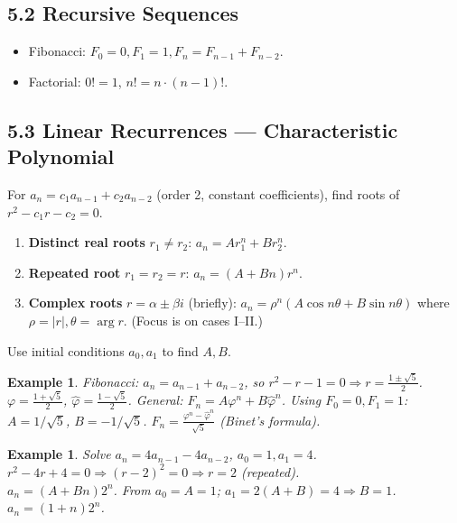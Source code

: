 \documentclass[11pt]{article}
\newtheorem{example}[definition]{Example}
\begin{document}
\subsection*{5.2 Recursive Sequences}

\begin{itemize}[nosep]
  \item Fibonacci: $F_0=0,F_1=1,F_n=F_{n-1}+F_{n-2}$.
  \item Factorial: $0!=1$, $n!=n\cdot(n-1)!$.
\end{itemize}

\subsection*{5.3 Linear Recurrences — Characteristic Polynomial}

For $a_n = c_1 a_{n-1}+c_2 a_{n-2}$ (order 2, constant coefficients), find roots of $r^2-c_1 r-c_2=0$.

\begin{tcolorbox}[keybox={Three cases}]
\begin{enumerate}[nosep,label=\Roman*.]
  \item \textbf{Distinct real roots} $r_1\ne r_2$: $a_n=A r_1^n+B r_2^n$.
  \item \textbf{Repeated root} $r_1=r_2=r$: $a_n=(A+Bn)r^n$.
  \item \textbf{Complex roots} $r=\alpha\pm\beta i$ (briefly): $a_n=\rho^n(A\cos n\theta+B\sin n\theta)$ where $\rho=|r|,\theta=\arg r$. (Focus is on cases I–II.)
\end{enumerate}
Use initial conditions $a_0,a_1$ to find $A,B$.
\end{tcolorbox}

\begin{example}
Fibonacci: $a_n=a_{n-1}+a_{n-2}$, so $r^2-r-1=0\Rightarrow r=\frac{1\pm\sqrt5}{2}$.\\
$\varphi=\frac{1+\sqrt5}{2}$, $\hat\varphi=\frac{1-\sqrt5}{2}$.
General: $F_n=A\varphi^n+B\hat\varphi^n$. Using $F_0=0,F_1=1$:
$A=1/\sqrt5$, $B=-1/\sqrt5$.
$\boxed{F_n=\frac{\varphi^n-\hat\varphi^n}{\sqrt5}}$ (Binet's formula).
\end{example}

\begin{example}
Solve $a_n=4a_{n-1}-4a_{n-2}$, $a_0=1,a_1=4$.\\
$r^2-4r+4=0\Rightarrow (r-2)^2=0\Rightarrow r=2$ (repeated).\\
$a_n=(A+Bn)2^n$. From $a_0=A=1$; $a_1=2(A+B)=4\Rightarrow B=1$.\\
$a_n=(1+n)2^n$.
\end{example}
\end{document}
